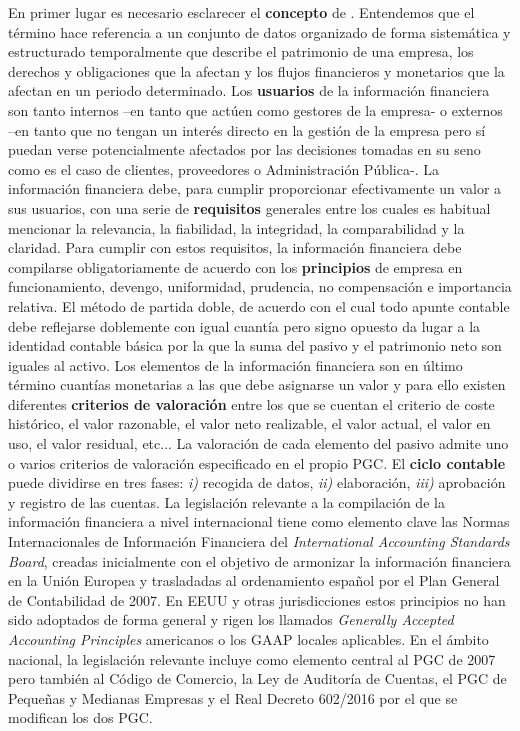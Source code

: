 \documentclass{nuevotema}
\begin{document}
En primer lugar es necesario esclarecer el \textbf{concepto} de . Entendemos que el término hace referencia a un conjunto de datos organizado de forma sistemática y estructurado temporalmente que describe el patrimonio de una empresa, los derechos y obligaciones que la afectan y los flujos financieros y monetarios que la afectan en un periodo determinado. Los \textbf{usuarios} de la información financiera son tanto internos --en tanto que actúen como gestores de la empresa- o externos --en tanto que no tengan un interés directo en la gestión de la empresa pero sí puedan verse potencialmente afectados por las decisiones tomadas en su seno como es el caso de clientes, proveedores o Administración Pública-. La información financiera debe, para cumplir proporcionar efectivamente un valor a sus usuarios, con una serie de \textbf{requisitos} generales entre los cuales es habitual mencionar la relevancia, la fiabilidad, la integridad, la comparabilidad y la claridad. Para cumplir con estos requisitos, la información financiera debe compilarse obligatoriamente de acuerdo con los \textbf{principios} de empresa en funcionamiento, devengo, uniformidad, prudencia, no compensación e importancia relativa. El método de partida doble, de acuerdo con el cual todo apunte contable debe reflejarse doblemente con igual cuantía pero signo opuesto da lugar a la identidad contable básica por la que la suma del pasivo y el patrimonio neto son iguales al activo. Los elementos de la información financiera son en último término cuantías monetarias a las que debe asignarse un valor y para ello existen diferentes \textbf{criterios de valoración} entre los que se cuentan el criterio de coste histórico, el valor razonable, el valor neto realizable, el valor actual, el valor en uso, el valor residual, etc... La valoración de cada elemento del pasivo admite uno o varios criterios de valoración especificado en el propio PGC. El \textbf{ciclo contable} puede dividirse en tres fases: \textit{i)} recogida de datos, \textit{ii)} elaboración, \textit{iii)} aprobación y registro de las cuentas. La legislación relevante a la compilación de la información financiera a nivel internacional tiene como elemento clave las Normas Internacionales de Información Financiera del \textit{International Accounting Standards Board}, creadas inicialmente con el objetivo de armonizar la información financiera en la Unión Europea y trasladadas al ordenamiento español por el Plan General de Contabilidad de 2007. En EEUU y otras jurisdicciones estos principios no han sido adoptados de forma general y rigen los llamados \textit{Generally Accepted Accounting Principles} americanos o los GAAP locales aplicables. En el ámbito nacional, la legislación relevante incluye como elemento central al PGC de 2007 pero también al Código de Comercio, la Ley de Auditoría de Cuentas, el PGC de Pequeñas y Medianas Empresas y el Real Decreto 602/2016 por el que se modifican los dos PGC.
\end{document}

